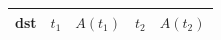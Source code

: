 \begin{tabular}{r r r r r}
\hline
dst & $t_1$ & $A(t_1)$ & $t_2$ & $A(t_2)$ \\
\hline
\hline
\end{tabular}
